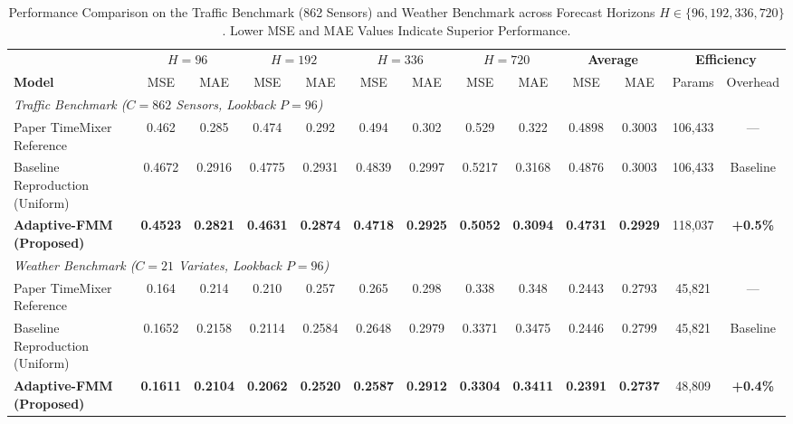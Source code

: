 \documentclass[journal]{IEEEtran}
\begin{document}
\begin{table}[t]
\centering
\caption{Performance Comparison on the Traffic Benchmark (862 Sensors) and Weather Benchmark across Forecast Horizons $H \in \{96, 192, 336, 720\}$. Lower MSE and MAE Values Indicate Superior Performance.}
\label{tab:main_results}
\small
\setlength{\tabcolsep}{5pt}
\begin{tabular}{lcccccccccccc}
\toprule
& \multicolumn{2}{c}{$H = 96$} & \multicolumn{2}{c}{$H = 192$} & \multicolumn{2}{c}{$H = 336$} & \multicolumn{2}{c}{$H = 720$} & \multicolumn{2}{c}{\textbf{Average}} & \multicolumn{2}{c}{\textbf{Efficiency}} \\
\cmidrule(lr){2-3} \cmidrule(lr){4-5} \cmidrule(lr){6-7} \cmidrule(lr){8-9} \cmidrule(lr){10-11} \cmidrule(lr){12-13}
\textbf{Model} & MSE & MAE & MSE & MAE & MSE & MAE & MSE & MAE & MSE & MAE & Params & Overhead \\
\midrule
\multicolumn{13}{l}{\textit{Traffic Benchmark ($C = 862$ Sensors, Lookback $P = 96$)}} \\
Paper TimeMixer Reference~\cite{wang2024timemixer} & 0.462 & 0.285 & 0.474 & 0.292 & 0.494 & 0.302 & 0.529 & 0.322 & 0.4898 & 0.3003 & 106,433 & --- \\
Baseline Reproduction (Uniform) & 0.4672 & 0.2916 & 0.4775 & 0.2931 & 0.4839 & 0.2997 & 0.5217 & 0.3168 & 0.4876 & 0.3003 & 106,433 & Baseline \\
\textbf{Adaptive-FMM (Proposed)} & \textbf{0.4523} & \textbf{0.2821} & \textbf{0.4631} & \textbf{0.2874} & \textbf{0.4718} & \textbf{0.2925} & \textbf{0.5052} & \textbf{0.3094} & \textbf{0.4731} & \textbf{0.2929} & 118,037 & \textbf{+0.5\%} \\
\midrule
\multicolumn{13}{l}{\textit{Weather Benchmark ($C = 21$ Variates, Lookback $P = 96$)}} \\
Paper TimeMixer Reference~\cite{wang2024timemixer} & 0.164 & 0.214 & 0.210 & 0.257 & 0.265 & 0.298 & 0.338 & 0.348 & 0.2443 & 0.2793 & 45,821 & --- \\
Baseline Reproduction (Uniform) & 0.1652 & 0.2158 & 0.2114 & 0.2584 & 0.2648 & 0.2979 & 0.3371 & 0.3475 & 0.2446 & 0.2799 & 45,821 & Baseline \\
\textbf{Adaptive-FMM (Proposed)} & \textbf{0.1611} & \textbf{0.2104} & \textbf{0.2062} & \textbf{0.2520} & \textbf{0.2587} & \textbf{0.2912} & \textbf{0.3304} & \textbf{0.3411} & \textbf{0.2391} & \textbf{0.2737} & 48,809 & \textbf{+0.4\%} \\
\bottomrule
\end{tabular}
\end{table}
\end{document}
